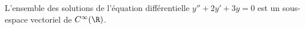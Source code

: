 L'ensemble des solutions de l'équation différentielle $y'' + 2y' + 3y = 0$ est un sous-espace vectoriel de $C^\infty(\R)$.

\begin{reponses}
\end{reponses}

